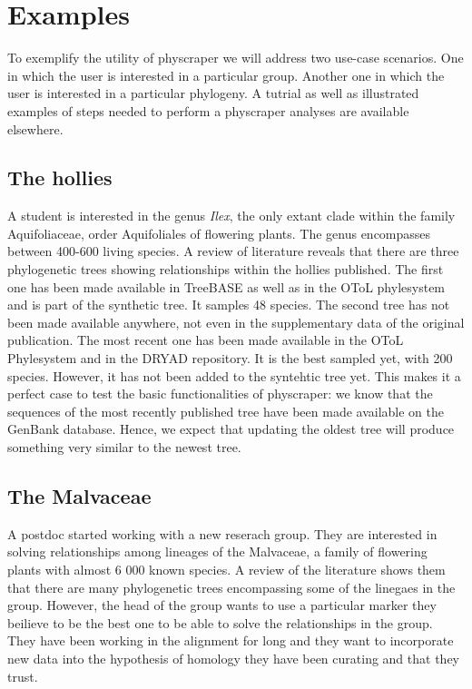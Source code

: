 \documentclass[]{article}
\begin{document}
\hypertarget{examples}{%
\section{Examples}\label{examples}}

To exemplify the utility of physcraper we will address two use-case scenarios. One in which the user is interested in a particular group. Another one in which the user is interested in a particular phylogeny.
A tutrial as well as illustrated examples of steps needed to perform a physcraper analyses are available elsewhere.

\hypertarget{the-hollies}{%
\subsection{The hollies}\label{the-hollies}}

A student is interested in the genus \emph{Ilex}, the only extant clade within the family Aquifoliaceae, order Aquifoliales of flowering plants.
The genus encompasses between 400-600 living species. A review of literature reveals that there are three phylogenetic trees showing relationships within the hollies published.
The first one has been made available in TreeBASE as well as in the OToL phylesystem and is part of the synthetic tree. It samples 48 species.
The second tree has not been made available anywhere, not even in the supplementary data of the original publication.
The most recent one has been made available in the OToL Phylesystem and in the DRYAD repository. It is the best sampled yet, with 200 species. However, it has not been added to the syntehtic tree yet.
This makes it a perfect case to test the basic functionalities of physcraper: we know that the sequences of the most recently published tree have been made available on the GenBank database. Hence, we expect that updating the oldest tree will produce something very similar to the newest tree.

\hypertarget{the-malvaceae}{%
\subsection{The Malvaceae}\label{the-malvaceae}}

A postdoc started working with a new reserach group. They are interested in solving relationships among lineages of the Malvaceae, a family of flowering plants with almost 6 000 known species.
A review of the literature shows them that there are many phylogenetic trees encompassing some of the linegaes in the group. However, the head of the group wants to use a particular marker they beilieve to be the best one to be able to solve the relationships in the group. They have been working in the alignment for long and they want to incorporate new data into the hypothesis of homology they have been curating and that they trust.
\end{document}
